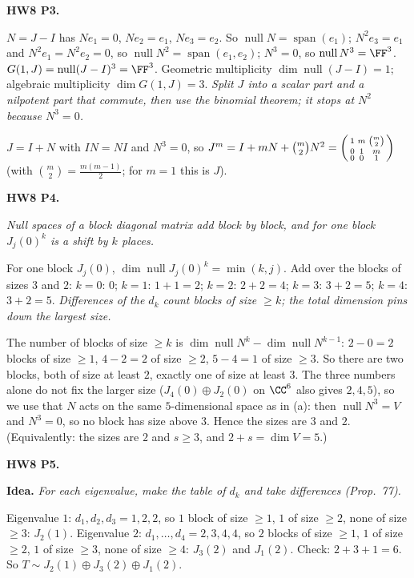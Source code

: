 \documentclass[10pt]{scrartcl}
\DeclareMathOperator{\nul}{null}
\DeclareMathOperator{\spn}{span}
\newcommand{\idea}[1]{{\color{OliveGreen!75!black}\textbf{Idea.}} \textit{#1}\par}
\newenvironment{prob}{\par\medskip\noindent\begin{minipage}{\linewidth}\setlength{\parskip}{3pt}}{\end{minipage}\par}
\begin{document}
\begin{prob}
\textbf{HW8 P3. }\par 
\begin{enumerate}[(a)]
  \ii $N=J-I$ has $Ne_1=0$, $Ne_2=e_1$, $Ne_3=e_2$. So $\nul N=\spn(e_1)$; $N^2e_3=e_1$ and $N^2e_1=N^2e_2=0$, so $\nul N^2=\spn(e_1,e_2)$; $N^3=0$, so $\nul N^3=\FF^3$.
  \ii $G(1,J)=\nul(J-I)^3=\FF^3$. Geometric multiplicity $\dim\nul(J-I)=1$; algebraic multiplicity $\dim G(1,J)=3$.
  \ii \idea{Split $J$ into a scalar part and a nilpotent part that commute, then use the binomial theorem; it stops at $N^2$ because $N^3=0$.}$J=I+N$ with $IN=NI$ and $N^3=0$, so $J^m=I+mN+\binom m2N^2=\begin{psmallmatrix}1&m&\binom m2\\0&1&m\\0&0&1\end{psmallmatrix}$ (with $\binom m2=\frac{m(m-1)}2$; for $m=1$ this is $J$).
\end{enumerate}
\end{prob}

\begin{prob}
\textbf{HW8 P4. }\par 
\begin{enumerate}[(a)]
  \ii \idea{Null spaces of a block diagonal matrix add block by block, and for one block $J_j(0)^k$ is a shift by $k$ places.}For one block $J_j(0)$, $\dim\nul J_j(0)^k=\min(k,j)$. Add over the blocks of sizes $3$ and $2$: $k=0$: $0$; $k=1$: $1+1=2$; $k=2$: $2+2=4$; $k=3$: $3+2=5$; $k=4$: $3+2=5$.
  \ii \idea{Differences of the $d_k$ count blocks of size $\ge k$; the total dimension pins down the largest size.}The number of blocks of size $\ge k$ is $\dim\nul N^k-\dim\nul N^{k-1}$: $2-0=2$ blocks of size $\ge1$, $4-2=2$ of size $\ge2$, $5-4=1$ of size $\ge3$. So there are two blocks, both of size at least $2$, exactly one of size at least $3$. The three numbers alone do not fix the larger size ($J_4(0)\oplus J_2(0)$ on $\CC^6$ also gives $2,4,5$), so we use that $N$ acts on the same $5$-dimensional space as in (a): then $\nul N^3=V$ and $N^3=0$, so no block has size above $3$. Hence the sizes are $3$ and $2$. (Equivalently: the sizes are $2$ and $s\ge3$, and $2+s=\dim V=5$.)
\end{enumerate}
\end{prob}

\begin{prob}
\textbf{HW8 P5. }\par 
\idea{For each eigenvalue, make the table of $d_k$ and take differences (Prop.~77).}Eigenvalue $1$: $d_1,d_2,d_3=1,2,2$, so $1$ block of size $\ge1$, $1$ of size $\ge2$, none of size $\ge3$: $J_2(1)$. Eigenvalue $2$: $d_1,\dots,d_4=2,3,4,4$, so $2$ blocks of size $\ge1$, $1$ of size $\ge2$, $1$ of size $\ge3$, none of size $\ge4$: $J_3(2)$ and $J_1(2)$. Check: $2+3+1=6$. So $T\sim J_2(1)\oplus J_3(2)\oplus J_1(2)$.
\end{prob}
\end{document}
